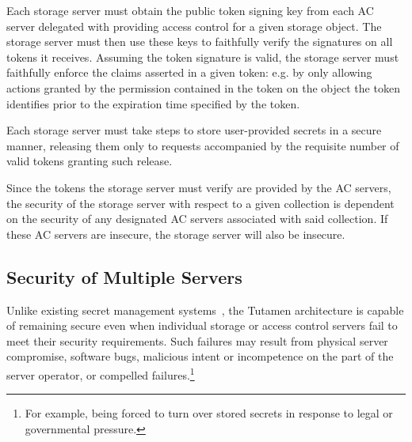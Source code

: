 \begin{packed_desc}
\item[Token Verification:] Each storage server must obtain the public
  token signing key from each AC server delegated with providing
  access control for a given storage object. The storage server must
  then use these keys to faithfully verify the signatures on all
  tokens it receives. Assuming the token signature is valid, the
  storage server must faithfully enforce the claims asserted in a
  given token: e.g. by only allowing actions granted by the permission
  contained in the token on the object the token identifies prior to
  the expiration time specified by the token.
\item[Secure Storage:] Each storage server must take steps to store
  user-provided secrets in a secure manner, releasing them only to
  requests accompanied by the requisite number of valid tokens
  granting such release.
\end{packed_desc}

Since the tokens the storage server must verify are provided by the AC
servers, the security of the storage server with respect to a given
collection is dependent on the security of any designated AC servers
associated with said collection. If these AC servers are insecure, the
storage server will also be insecure.

\subsection{Security of Multiple Servers}

Unlike existing secret management systems~\cite{vault, confidant,
  keywhiz}, the Tutamen architecture is capable of remaining secure
even when individual storage or access control servers fail to meet
their security requirements. Such failures may result from physical
server compromise, software bugs, malicious intent or incompetence on
the part of the server operator, or compelled failures.\footnote{For
  example, being forced to turn over stored secrets in response to
  legal or governmental pressure.}

